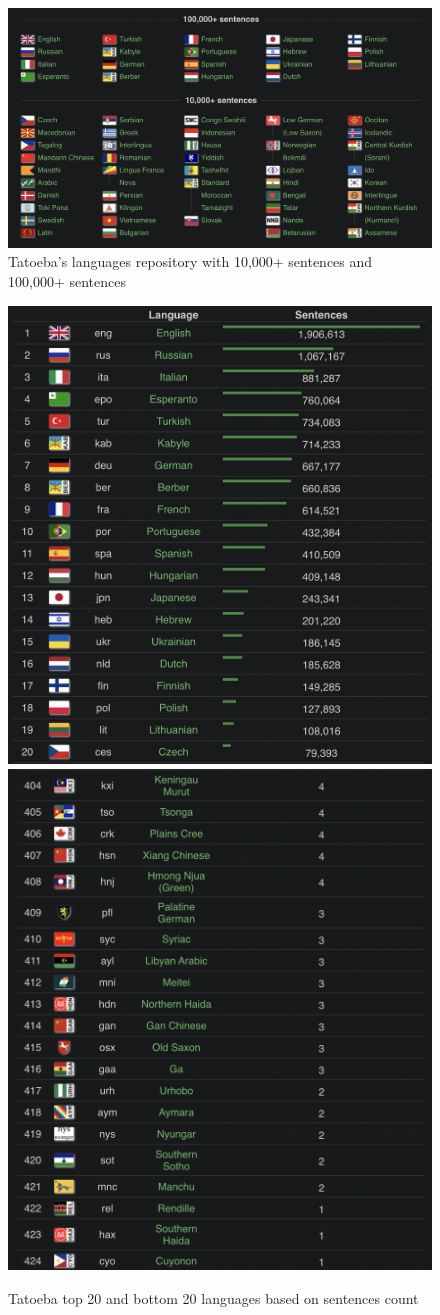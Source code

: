 \documentclass[a4paper]{article}
\begin{document}
\begin{figure}[htbp]
    \centering
    \includegraphics[width=0.9\linewidth]{images/tatoeba_languages.png}
    \caption{Tatoeba's languages repository with 10,000+ sentences and 100,000+ sentences \cite{tatoeba}}
    \label{fig:tatoeba_languages}
\end{figure}


\begin{figure}[htbp]
    \centering
    \includegraphics[width=0.5\linewidth]{images/tatoeba_top_20_lang.png}
    \includegraphics[width=0.46\linewidth]{images/tatoeba_bottom_20_lang.png}
    \caption{Tatoeba top 20 and bottom 20 languages based on sentences count \cite{tatoeba}}
    \label{fig:tatoeba_top_bottom_languages}
\end{figure}
\end{document}
